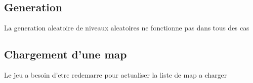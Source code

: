 \documentclass[../main.tex]{subfiles}
\begin{document}
\subsection{Generation}
La generation aleatoire de niveaux aleatoires ne fonctionne pas dans tous des cas

\subsection{Chargement d'une map}
Le jeu a besoin d'etre redemarre pour actualiser la liste de map a charger
\end{document}
